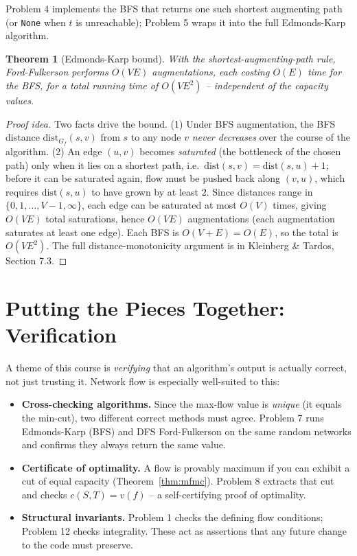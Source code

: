 \documentclass[11pt]{article}
\newtheorem{theorem}{Theorem}[section]
\begin{document}
Problem 4 implements the BFS that returns one such shortest augmenting path (or
\texttt{None} when $t$ is unreachable); Problem 5 wraps it into the full Edmonds-Karp
algorithm.

\begin{theorem}[Edmonds-Karp bound]
\label{thm:ek-bound}
With the shortest-augmenting-path rule, Ford-Fulkerson performs $O(VE)$ augmentations,
each costing $O(E)$ time for the BFS, for a total running time of $O(VE^2)$ -- independent
of the capacity values.
\end{theorem}

\begin{proof}[Proof idea]
Two facts drive the bound. (1) Under BFS augmentation, the BFS distance
$\mathrm{dist}_{G_f}(s, v)$ from $s$ to any node $v$ \emph{never decreases} over the course
of the algorithm. (2) An edge $(u,v)$ becomes \emph{saturated} (the bottleneck of the
chosen path) only when it lies on a shortest path, i.e.\ $\mathrm{dist}(s,v) =
\mathrm{dist}(s,u)+1$; before it can be saturated again, flow must be pushed back along
$(v,u)$, which requires $\mathrm{dist}(s,u)$ to have grown by at least $2$. Since distances
range in $\{0, 1, \ldots, V-1, \infty\}$, each edge can be saturated at most $O(V)$ times,
giving $O(VE)$ total saturations, hence $O(VE)$ augmentations (each augmentation saturates
at least one edge). Each BFS is $O(V+E) = O(E)$, so the total is $O(VE^2)$. The full
distance-monotonicity argument is in Kleinberg \& Tardos, Section 7.3.
\end{proof}

\section{Putting the Pieces Together: Verification}

A theme of this course is \emph{verifying} that an algorithm's output is actually
correct, not just trusting it. Network flow is especially well-suited to this:
\begin{itemize}
    \item \textbf{Cross-checking algorithms.} Since the max-flow value is \emph{unique}
    (it equals the min-cut), two different correct methods must agree. Problem 7 runs
    Edmonds-Karp (BFS) and DFS Ford-Fulkerson on the same random networks and confirms
    they always return the same value.
    \item \textbf{Certificate of optimality.} A flow is provably maximum if you can
    exhibit a cut of equal capacity (Theorem~\ref{thm:mfmc}). Problem 8 extracts that cut
    and checks $c(S,T) = v(f)$ -- a self-certifying proof of optimality.
    \item \textbf{Structural invariants.} Problem 1 checks the defining flow conditions;
    Problem 12 checks integrality. These act as assertions that any future change to the
    code must preserve.
\end{itemize}
\end{document}
